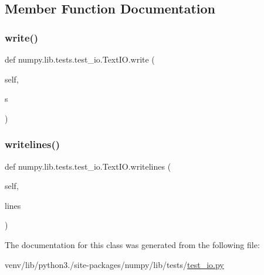 \subsection{Member Function Documentation}
\mbox{\label{classnumpy_1_1lib_1_1tests_1_1test__io_1_1TextIO_a19f29b1433b070b2e0c63519991f450c}} 
\subsubsection{\texorpdfstring{write()}{write()}}
{\footnotesize\ttfamily def numpy.\+lib.\+tests.\+test\+\_\+io.\+Text\+I\+O.\+write (\begin{DoxyParamCaption}\item[{}]{self,  }\item[{}]{s }\end{DoxyParamCaption})}

\mbox{\label{classnumpy_1_1lib_1_1tests_1_1test__io_1_1TextIO_ad2fe454f318918bef4c5d2fce9d45bd6}} 
\subsubsection{\texorpdfstring{writelines()}{writelines()}}
{\footnotesize\ttfamily def numpy.\+lib.\+tests.\+test\+\_\+io.\+Text\+I\+O.\+writelines (\begin{DoxyParamCaption}\item[{}]{self,  }\item[{}]{lines }\end{DoxyParamCaption})}



The documentation for this class was generated from the following file\+:\begin{DoxyCompactItemize}
\item 
venv/lib/python3./site-\/packages/numpy/lib/tests/\hyperlink{test__io_8py}{test\+\_\+io.\+py}\end{DoxyCompactItemize}
